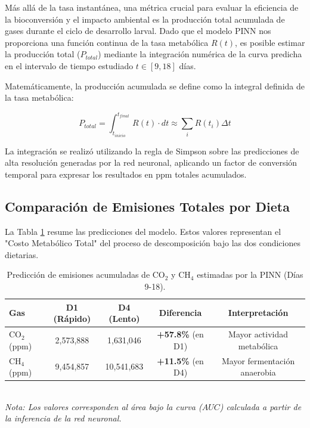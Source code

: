 Más allá de la tasa instantánea, una métrica crucial para evaluar la eficiencia de la bioconversión y el impacto ambiental es la producción total acumulada de gases durante el ciclo de desarrollo larval. Dado que el modelo PINN nos proporciona una función continua de la tasa metabólica $R(t)$, es posible estimar la producción total ($P_{total}$) mediante la integración numérica de la curva predicha en el intervalo de tiempo estudiado $t \in [9, 18]$ días.

Matemáticamente, la producción acumulada se define como la integral definida de la tasa metabólica:

\begin{equation}
    P_{total} = \int_{t_{inicio}}^{t_{final}} R(t) \cdot dt \approx \sum_{i} R(t_i) \Delta t
\end{equation}

La integración se realizó utilizando la regla de Simpson sobre las predicciones de alta resolución generadas por la red neuronal, aplicando un factor de conversión temporal para expresar los resultados en ppm totales acumulados.

\subsection{Comparación de Emisiones Totales por Dieta}

La Tabla \ref{tab:emisiones_totales} resume las predicciones del modelo. Estos valores representan el "Costo Metabólico Total" del proceso de descomposición bajo las dos condiciones dietarias.

\begin{table}[h!]
    \centering
    \caption{Predicción de emisiones acumuladas de CO$_2$ y CH$_4$ estimadas por la PINN (Días 9-18).}
    \label{tab:emisiones_totales}
    \begin{tabular}{lcccc}
        \hline
        \textbf{Gas} & \textbf{D1 (Rápido)} & \textbf{D4 (Lento)} & \textbf{Diferencia} & \textbf{Interpretación} \\ \hline
        CO$_2$ (ppm) & 2,573,888 & 1,631,046 & \textbf{+57.8\%} (en D1) & Mayor actividad metabólica \\ 
        CH$_4$ (ppm) & 9,454,857 & 10,541,683 & \textbf{+11.5\%} (en D4) & Mayor fermentación anaerobia \\ \hline
    \end{tabular}
    \small{\\ \textit{Nota: Los valores corresponden al área bajo la curva ($AUC$) calculada a partir de la inferencia de la red neuronal.}}
\end{table}

